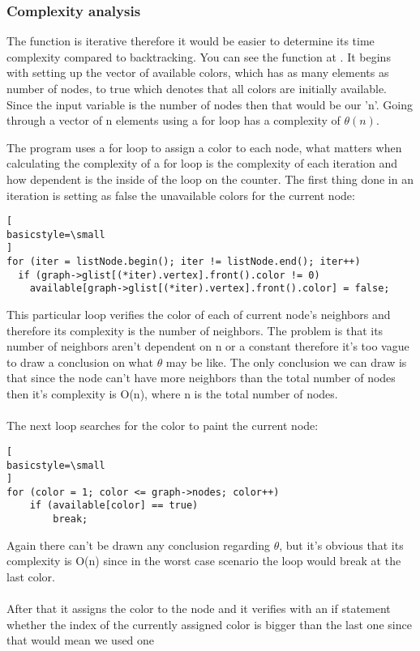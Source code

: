 \documentclass[runningheads]{llncs}
\begin{document}
\subsubsection{Complexity analysis}
The function is iterative therefore it would be easier to determine its time complexity compared to backtracking. You can see the function at
\cite{ref_url8}. It begins with setting up the vector of available colors, which has as many elements as number of
nodes, to true which denotes that all colors are initially available. Since the input variable is the number of nodes
then that would be our 'n'. Going through a vector of n elements using a for loop has a complexity of $\theta(n)$.

The program uses a for loop to assign a color to each node, what matters when calculating the complexity of a for loop is
the complexity of each iteration and how dependent is the inside of the loop on the counter. The first thing done in an
iteration is setting as false the unavailable colors for the current node:
\begin{lstlisting}[
basicstyle=\small
]
for (iter = listNode.begin(); iter != listNode.end(); iter++)
  if (graph->glist[(*iter).vertex].front().color != 0)
    available[graph->glist[(*iter).vertex].front().color] = false;
\end{lstlisting}
This particular loop verifies the color of each of current node's neighbors and therefore its complexity
is the number of neighbors. The problem is that its number of neighbors aren't dependent on n or a constant
therefore it's too vague to draw a conclusion on what $\theta$ may be like. The only conclusion we can
draw is that since the node can't have more neighbors than the total number of nodes then it's complexity
is O(n), where n is the total number of nodes.
\\
\\
The next loop searches for the color to paint the current node:
\begin{lstlisting}[
basicstyle=\small
]
for (color = 1; color <= graph->nodes; color++)
	if (available[color] == true)
		break;
\end{lstlisting}
Again there can't be drawn any conclusion regarding $\theta$, but it's obvious that its complexity is
O(n) since in the worst case scenario the loop would break at the last color.
\\
\\
After that it assigns the color to the node and it verifies with an if statement whether the
index of the currently assigned color is bigger than the last one since that would mean we used one
\end{document}
